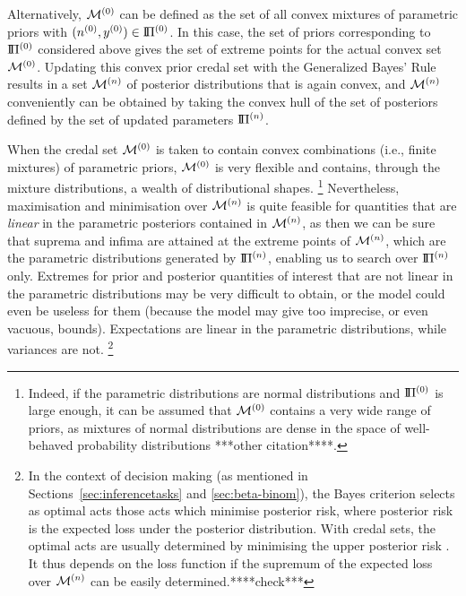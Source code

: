 Alternatively, $\mathcal{M}^{(0)}$ can be defined as the set of all convex mixtures of parametric priors with $(n^{(0)}, y^{(0)}) \in \text{I}\!\Pi^{(0)}$.
In this case, the set of priors corresponding to $\text{I}\!\Pi^{(0)}$ considered above gives the set of extreme points for the actual convex set $\mathcal{M}^{(0)}$.
Updating this convex prior credal set with the Generalized Bayes' Rule results in a set $\mathcal{M}^{(n)}$ of posterior distributions that is again convex,
and $\mathcal{M}^{(n)}$ conveniently can be obtained by taking the convex hull of the set of posteriors
defined by the set of updated parameters $\text{I}\!\Pi^{(n)}$.

When the credal set $\mathcal{M}^{(0)}$ is taken to contain convex combinations (i.e., finite mixtures) of parametric priors,
$\mathcal{M}^{(0)}$ is very flexible and contains, through the mixture distributions, a wealth of distributional shapes.%
\footnote{Indeed, if the parametric distributions are normal distributions
and $\text{I}\!\Pi^{(0)}$ is large enough,
it can be assumed that $\mathcal{M}^{(0)}$ contains a very wide range of priors,
as mixtures of normal distributions are dense in the space of well-behaved probability distributions
\parencite[see, e.g.,][p.~44]{2000:priebe}***other citation****.}
Nevertheless, maximisation and minimisation over $\mathcal{M}^{(n)}$
is quite feasible for quantities that are \emph{linear} in the parametric posteriors contained in $\mathcal{M}^{(n)}$,
as then we can be sure that suprema and infima are attained at the extreme points of $\mathcal{M}^{(n)}$,
which are the parametric distributions generated by $\text{I}\!\Pi^{(n)}$, enabling us to search over $\text{I}\!\Pi^{(n)}$ only.
Extremes for prior and posterior quantities of interest that are not linear in the parametric distributions
may be very difficult to obtain,
or the model could even be useless for them (because the model may give too imprecise, or even vacuous, bounds).
Expectations are linear in the parametric distributions, while variances are not.%
\footnote{In the context of decision making (as mentioned in Sections~\ref{sec:inferencetasks} and \ref{sec:beta-binom}),
the Bayes criterion selects as optimal acts those acts which minimise posterior risk,
where posterior risk is the expected loss under the posterior distribution.
With credal sets, the optimal acts are usually determined by minimising the upper posterior risk
\parencite[see, e.g.,][\S 3.2]{itip-decision}.
It thus depends on the loss function if the supremum of the expected loss over $\mathcal{M}^{(n)}$ can be easily determined.****check***}

%

